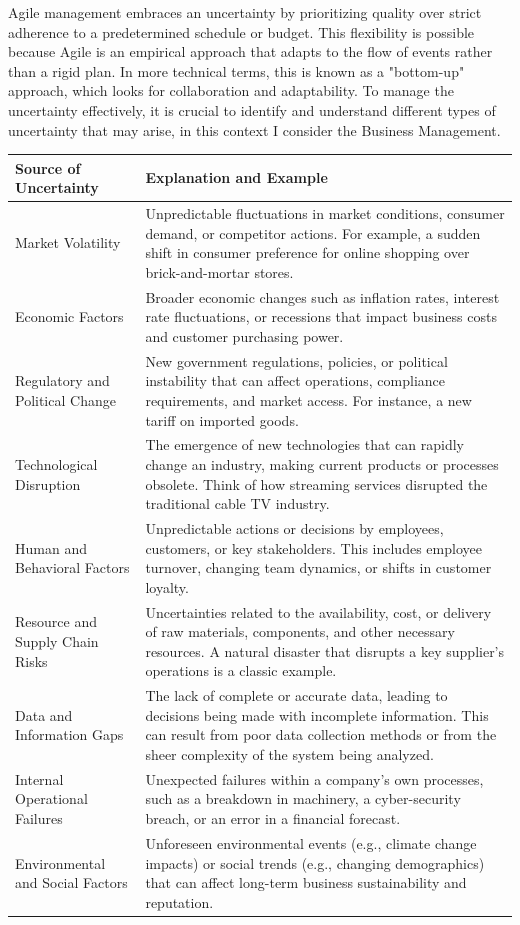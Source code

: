 \documentclass{article}
\begin{document}
Agile management embraces an uncertainty by prioritizing quality over strict adherence to a predetermined schedule or budget. This flexibility is possible because Agile is an empirical approach that adapts to the flow of events rather than a rigid plan. In more technical terms, this is known as a "bottom-up" approach, which looks for collaboration and adaptability. To manage the uncertainty effectively, it is crucial to identify and understand different types of uncertainty that may arise, in this context I consider the Business Management. \\
\begin{center}
\begin{tabular}{|m{3cm}|m{11cm}|}
 \hline
 \textbf{Source of Uncertainty} & \textbf{Explanation and Example} \\
 \hline
 Market Volatility & Unpredictable fluctuations in market conditions, consumer demand, or competitor actions. For example, a sudden shift in consumer preference for online shopping over brick-and-mortar stores. \\
 \hline
 Economic Factors & Broader economic changes such as inflation rates, interest rate fluctuations, or recessions that impact business costs and customer purchasing power. \\
 \hline
 Regulatory and Political Change & New government regulations, policies, or political instability that can affect operations, compliance requirements, and market access. For instance, a new tariff on imported goods. \\
 \hline
 Technological Disruption & The emergence of new technologies that can rapidly change an industry, making current products or processes obsolete. Think of how streaming services disrupted the traditional cable TV industry. \\
 \hline
 Human and Behavioral Factors & Unpredictable actions or decisions by employees, customers, or key stakeholders. This includes employee turnover, changing team dynamics, or shifts in customer loyalty. \\
 \hline
 Resource and Supply Chain Risks & Uncertainties related to the availability, cost, or delivery of raw materials, components, and other necessary resources. A natural disaster that disrupts a key supplier's operations is a classic example. \\
 \hline
 Data and Information Gaps & The lack of complete or accurate data, leading to decisions being made with incomplete information. This can result from poor data collection methods or from the sheer complexity of the system being analyzed. \\
 \hline
 Internal Operational Failures & Unexpected failures within a company's own processes, such as a breakdown in machinery, a cyber-security breach, or an error in a financial forecast. \\
 \hline
 Environmental and Social Factors & Unforeseen environmental events (e.g., climate change impacts) or social trends (e.g., changing demographics) that can affect long-term business sustainability and reputation. \\
 \hline
\end{tabular}
\end{center}
\end{document}
